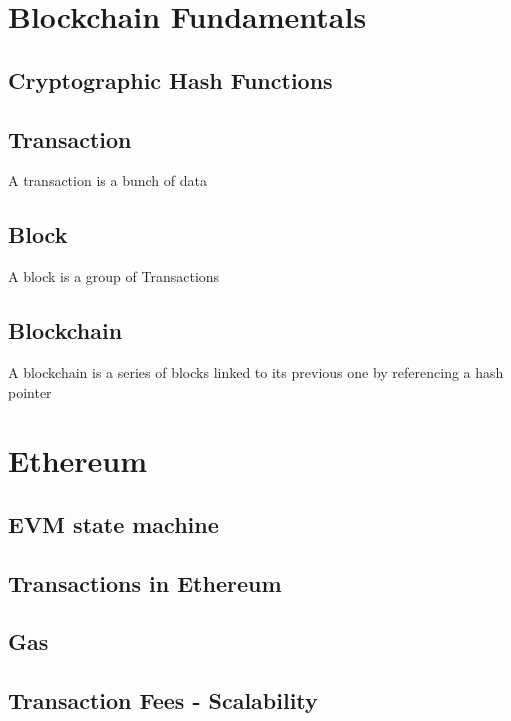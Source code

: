 \section{Blockchain Fundamentals}
\subsection{Cryptographic Hash Functions}
\subsection{Transaction}
A transaction is a bunch of data 
\subsection{Block}
A block is a group of Transactions
\subsection{Blockchain}
A blockchain is a series of blocks linked to its previous one by referencing a hash pointer 

\section{Ethereum}
\subsection{EVM state machine}
\subsection{Transactions in Ethereum}
\subsection{Gas}
\subsection{Transaction Fees - Scalability}